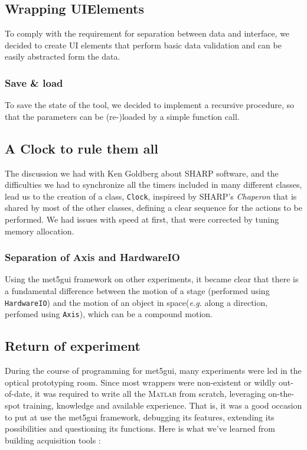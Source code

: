 \documentclass[10pt,letter,twoside]{report}
\begin{document}
\subsection{Wrapping UIElements}
To comply with the requirement for separation between data and interface, we decided to create UI elements that perform basic data validation and can be easily abstracted form the data.
\subsubsection{Save \& load}
To save the state of the tool, we decided to implement a recursive procedure, so that the parameters can be (re-)loaded by a simple function call.
\subsection{A Clock to rule them all}
The discussion we had with Ken Goldberg about SHARP software, and the difficulties we had to synchronize all the timers included in many different classes, lead us to the creation of a class, \verb!Clock!, inspireed by SHARP's \textit{Chaperon} that is shared by most of the other classes, defining a clear sequence for the actions to be performed. 
We had issues with speed at first, that were corrected by tuning memory allocation.
\subsubsection{Separation of Axis and HardwareIO}
Using the met5gui framework on other experiments, it became clear that there is a fundamental difference between the motion of a stage (performed using \verb!HardwareIO!) and the motion of an object in space(\textit{e.g.} along a direction, perfomed using \verb!Axis!), which can be a compound motion.


\subsection{Return of experiment} \label{sec:roe}
During the course of programming for met5gui, many experiments were led in the optical prototyping room.
Since most wrappers were non-existent or wildly out-of-date, it was required to write all the \textsc{Matlab} from scratch, leveraging on-the-spot training, knowledge and available experience.
That is, it was a good occasion to put at use the met5gui framework, debugging its features, extending its possibilities and questioning its functions.
Here is what we've learned from building acquisition tools :
\end{document}
